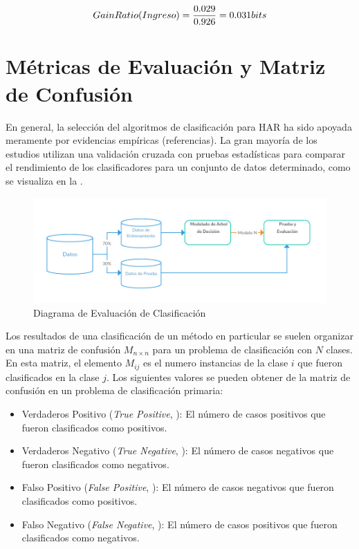 \begin{equation*}
GainRatio(Ingreso) = \frac{0.029}{0.926} = 0.031 bits \\
\end{equation*}



\section{Métricas de Evaluación y Matriz de Confusión}
\label{sec3:metricas}En general, la selección del algoritmos de clasificación para HAR ha sido apoyada meramente por evidencias empíricas (referencias). La gran mayoría de los estudios utilizan una validación cruzada con pruebas estadísticas para comparar el rendimiento de los clasificadores para un conjunto de datos determinado, como se visualiza en la .

\begin{figure}[!tbph]
	\centering
	\includegraphics[width=0.7\linewidth]{capitulo-3/graphics/training-test}
	\caption[Diagrama de evaluación de clasificación]{\label{fig:evaluacion}Diagrama de Evaluación de Clasificación}
\end{figure}
	
Los resultados de una clasificación de un método en particular se suelen organizar en una matriz de confusión $M_{n \times n}$ para un problema de clasificación con $N$ clases.
En esta matriz, el elemento $M_{ij}$ es el numero instancias de la clase $i$ que fueron clasificados en la clase $j$.
Los siguientes valores se pueden obtener de la matriz de confusión en un problema de clasificación primaria:

\begin{itemize}
	\item Verdaderos Positivo (\emph{True Positive}, ): El número de casos positivos que fueron clasificados como positivos.
	\item Verdaderos Negativo (\emph{True Negative}, ): El número de casos negativos que fueron clasificados como negativos.
	\item Falso Positivo (\emph{False Positive}, ): El número de casos negativos que fueron clasificados como positivos.
	\item Falso Negativo (\emph{False Negative}, ): El número de casos positivos que fueron clasificados como negativos.
\end{itemize}


